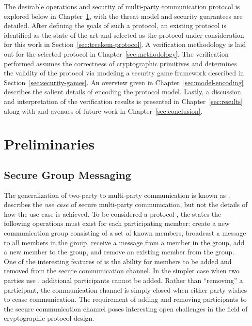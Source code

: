 The desirable operations and security of multi-party communication protocol is explored below in Chapter\ \ref{sec:preliminaries}, with the threat model and security guarantees are detailed.
After defining the goals of such a protocol, an existing protocol is identified as the state-of-the-art and selected as the protocol under consideration for this work in Section\ \ref{sec:treekem-protocol}.
A verification methodology is laid out for the selected protocol in Chapter\ \ref{sec:methodology}.
The verification performed assumes the correctness of cryptographic primitives and determines the validity of the protocol via modeling a security game framework described in Section\ \ref{sec:security-games}.
An overview given in Chapter\ \ref{sec:model-encoding} describes the salient details of encoding the protocol model.
Lastly, a discussion and interpretation of the verification results is presented in Chapter\ \ref{sec:results} along with and avenues of future work in Chapter\ \ref{sec:conclusion}.


\hypertarget{sec:preliminaries}{%
\chapter{Preliminaries}\label{sec:preliminaries}}


\hypertarget{sec:secure-group-messaging}{%
\section{Secure Group Messaging}\label{sec:secure-group-messaging}}

The generalization of two-party  to multi-party communication is known as  \autocite{cohn2018ends}.
 describes the \emph{use case} of secure multi-party communication, but not the details of how the use case is achieved.
To be considered a  protocol \autocite{ietf-mls-protocol-14}, the  states the following operations must exist for each participating member: create a new communication group consisting of a set of known members, broadcast a message to all members in the group, receive a message from a member in the group, add a new member to the group, and remove an existing member from the group.
One of the interesting features of  is the ability for members to be added and removed from the secure communication channel.
In the simpler case when two parties use , additional participants cannot be added.
Rather than ``removing'' a participant, the communication channel is simply closed when either party wishes to cease communication.
The  requirement of adding and removing participants to the secure communication channel poses interesting open challenges in the field of cryptographic protocol design.


